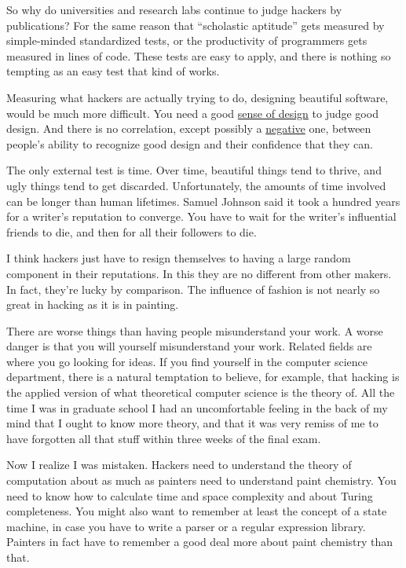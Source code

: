 So why do universities and research labs continue to judge hackers by
publications? For the same reason that ``scholastic aptitude'' gets
measured by simple-minded standardized tests, or the productivity of
programmers gets measured in lines of code. These tests are easy to
apply, and there is nothing so tempting as an easy test that kind of
works.

Measuring what hackers are actually trying to do, designing beautiful
software, would be much more difficult. You need a good
\href{taste.html}{sense of design} to judge good design. And there is no
correlation, except possibly a
\href{http://www.apa.org/journals/features/psp7761121.pdf}{negative}
one, between people's ability to recognize good design and their
confidence that they can.

The only external test is time. Over time, beautiful things tend to
thrive, and ugly things tend to get discarded. Unfortunately, the
amounts of time involved can be longer than human lifetimes. Samuel
Johnson said it took a hundred years for a writer's reputation to
converge. You have to wait for the writer's influential friends to die,
and then for all their followers to die.

I think hackers just have to resign themselves to having a large random
component in their reputations. In this they are no different from other
makers. In fact, they're lucky by comparison. The influence of fashion
is not nearly so great in hacking as it is in painting.

There are worse things than having people misunderstand your work. A
worse danger is that you will yourself misunderstand your work. Related
fields are where you go looking for ideas. If you find yourself in the
computer science department, there is a natural temptation to believe,
for example, that hacking is the applied version of what theoretical
computer science is the theory of. All the time I was in graduate school
I had an uncomfortable feeling in the back of my mind that I ought to
know more theory, and that it was very remiss of me to have forgotten
all that stuff within three weeks of the final exam.

Now I realize I was mistaken. Hackers need to understand the theory of
computation about as much as painters need to understand paint
chemistry. You need to know how to calculate time and space complexity
and about Turing completeness. You might also want to remember at least
the concept of a state machine, in case you have to write a parser or a
regular expression library. Painters in fact have to remember a good
deal more about paint chemistry than that.

